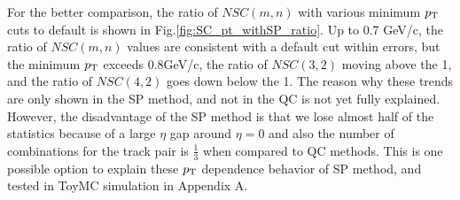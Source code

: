   For the better comparison, the ratio of  $NSC(m,n)$ with various minimum $p_{\rm{T}}$ cuts to default is shown in Fig.\ref{fig:SC_pt_withSP_ratio}. Up to 0.7 GeV/c, the ratio of $NSC(m,n)$ values are consistent with a default cut within errors, but the minimum $p_{\rm{T}}$ exceeds 0.8GeV/c, the ratio of $NSC(3,2)$ moving above the 1, and the ratio of $NSC(4,2)$ goes down below the 1. The reason why these trends are only shown in the SP method, and not in the QC is not yet fully explained. However, the disadvantage of the SP method is that we lose almost half of the statistics because of a large $\eta$ gap around $\eta=0$ and also the number of combinations for the track pair is $\frac{1}{3}$ when compared to QC methods. This is one possible option to explain these $p_{\rm{T}}$ dependence behavior of SP method, and  tested in ToyMC simulation in Appendix A.

